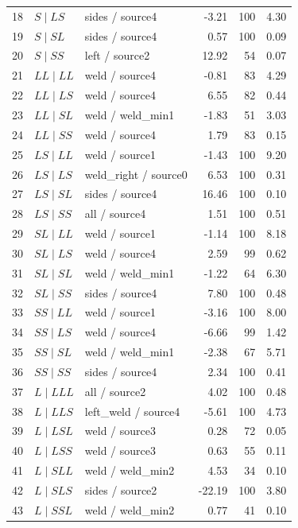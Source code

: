 \documentclass[11pt]{article}
\begin{document}
\begin{longtable}{@{}r>{\raggedright\arraybackslash}p{.28\linewidth}>{\raggedright\arraybackslash}p{.27\linewidth}rrr@{}}
18 & $S\mid LS$ & sides / source4 & -3.21 & 100 & 4.30\\
19 & $S\mid SL$ & sides / source4 & 0.57 & 100 & 0.09\\
20 & $S\mid SS$ & left / source2 & 12.92 & 54 & 0.07\\
21 & $LL\mid LL$ & weld / source4 & -0.81 & 83 & 4.29\\
22 & $LL\mid LS$ & weld / source4 & 6.55 & 82 & 0.44\\
23 & $LL\mid SL$ & weld / weld\_\allowbreak min1 & -1.83 & 51 & 3.03\\
24 & $LL\mid SS$ & weld / source4 & 1.79 & 83 & 0.15\\
25 & $LS\mid LL$ & weld / source1 & -1.43 & 100 & 9.20\\
26 & $LS\mid LS$ & weld\_\allowbreak right / source0 & 6.53 & 100 & 0.31\\
27 & $LS\mid SL$ & sides / source4 & 16.46 & 100 & 0.10\\
28 & $LS\mid SS$ & all / source4 & 1.51 & 100 & 0.51\\
29 & $SL\mid LL$ & weld / source1 & -1.14 & 100 & 8.18\\
30 & $SL\mid LS$ & weld / source4 & 2.59 & 99 & 0.62\\
31 & $SL\mid SL$ & weld / weld\_\allowbreak min1 & -1.22 & 64 & 6.30\\
32 & $SL\mid SS$ & sides / source4 & 7.80 & 100 & 0.48\\
33 & $SS\mid LL$ & weld / source1 & -3.16 & 100 & 8.00\\
34 & $SS\mid LS$ & weld / source4 & -6.66 & 99 & 1.42\\
35 & $SS\mid SL$ & weld / weld\_\allowbreak min1 & -2.38 & 67 & 5.71\\
36 & $SS\mid SS$ & sides / source4 & 2.34 & 100 & 0.41\\
37 & $L\mid LLL$ & all / source2 & 4.02 & 100 & 0.48\\
38 & $L\mid LLS$ & left\_\allowbreak weld / source4 & -5.61 & 100 & 4.73\\
39 & $L\mid LSL$ & weld / source3 & 0.28 & 72 & 0.05\\
40 & $L\mid LSS$ & weld / source3 & 0.63 & 55 & 0.11\\
41 & $L\mid SLL$ & weld / weld\_\allowbreak min2 & 4.53 & 34 & 0.10\\
42 & $L\mid SLS$ & sides / source2 & -22.19 & 100 & 3.80\\
43 & $L\mid SSL$ & weld / weld\_\allowbreak min2 & 0.77 & 41 & 0.10\\

\end{longtable}
\end{document}

